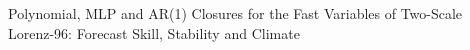 Polynomial, MLP and AR(1) Closures for the Fast Variables of Two-Scale Lorenz-96: Forecast Skill, Stability and Climate

